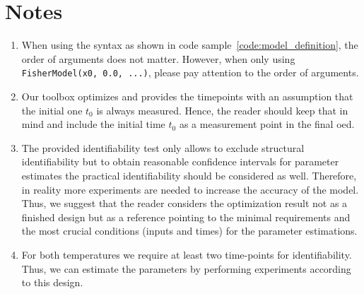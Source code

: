 \documentclass[graybox]{svmult}
\begin{document}
\section{Notes}
\begin{enumerate}
    \item \label{note-order-arguments-python} When using the syntax as shown in code sample~\ref{code:model_definition}, the order of arguments does not matter. However, when only using \texttt{FisherModel(x0, 0.0, ...)}, please pay attention to the order of arguments.
    \item \label{note-timepoints} Our toolbox optimizes and provides the timepoints with an assumption that the initial one $t_0$ is always measured. Hence, the reader should keep that in mind and include the initial time $t_0$ as a measurement point in the final \ac{oed}.
    \item \label{note-structural-identifiability} The provided identifiability test only allows to exclude structural identifiability but to obtain reasonable confidence intervals for parameter estimates the practical identifiability should be considered as well. Therefore, in reality more experiments are needed to increase the accuracy of the model. Thus, we suggest that the reader considers the optimization result not as a finished design but as a reference pointing to the minimal requirements and the most crucial conditions (inputs and times) for the parameter estimations.
    \item \label{note-temperature-identifiability} For both temperatures we require at least two time-points for identifiability. Thus, we can estimate the parameters by performing experiments according to this design.
\end{enumerate}
%
%
%
\end{document}
